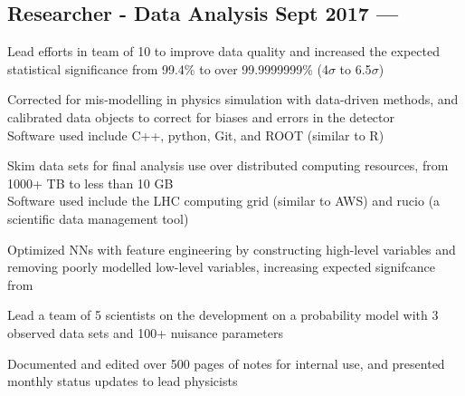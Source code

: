 \documentclass[letter,10pt]{article}
\begin{document}
\subsection{{Researcher - Data Analysis  \hfill Sept 2017 --- }}
\begin{zitemize}
\item Lead efforts in team of 10 to improve data quality and increased the expected statistical significance from 99.4\% to over 99.9999999\% (4$\sigma$ to 6.5$\sigma$)
\item Corrected for mis-modelling in physics simulation with data-driven methods, and calibrated data objects to correct for biases and errors in the detector \\
Software used include C++, python, Git, and ROOT (similar to R)
\item Skim data sets for final analysis use over distributed computing resources, from  1000+ TB to less than 10 GB \\
Software used include the LHC computing grid (similar to AWS) and rucio (a scientific data management tool)
\item Optimized NNs with feature engineering by constructing high-level variables and removing poorly modelled low-level variables, increasing expected signifcance from 
\item Lead a team of 5 scientists on the development on a probability model with 3 observed data sets and 100+ nuisance parameters
\item Documented and edited over 500 pages of notes for internal use, and presented monthly status updates to lead physicists
\end{zitemize}
\end{document}
